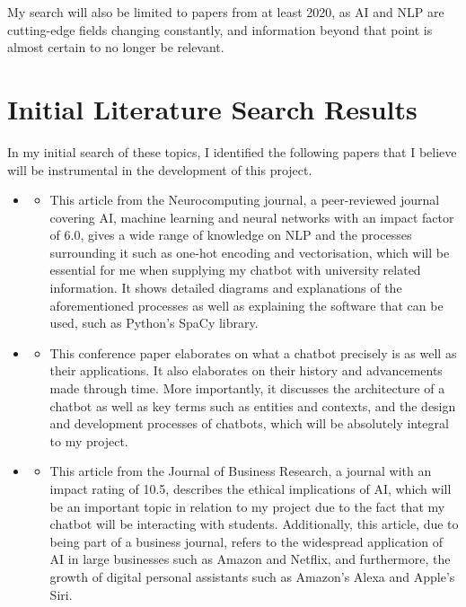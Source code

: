 \documentclass[12pt]{report}
\begin{document}
    \noindent My search will also be limited to papers from at least 2020, as AI and NLP are cutting-edge fields changing
    constantly, and information beyond that point is almost certain to no longer be relevant.

    \section{Initial Literature Search Results}
    In my initial search of these topics, I identified the following papers that I believe will be instrumental
    in the development of this project.

    \begin{itemize}
        \item {} 
        \begin{itemize}
            \item This article from the Neurocomputing journal, a peer-reviewed journal covering AI, machine learning
            and neural networks with an impact factor of 6.0, gives a wide range of knowledge on NLP and the processes
            surrounding it such as one-hot encoding and vectorisation, which will be essential for me when 
            supplying my chatbot with university related information. It shows detailed diagrams and explanations of
            the aforementioned processes as well as explaining the software that can be used, such as Python's 
            SpaCy library.
        \end{itemize}

        \item {}
        \begin{itemize}
            \item This conference paper elaborates on what a chatbot precisely is as well as their applications. It
            also elaborates on their history and advancements made through time. More importantly, it discusses the
            architecture of a chatbot as well as key terms such as entities and contexts, and the design and 
            development processes of chatbots, which will be absolutely integral to my project.
        \end{itemize}

        \item {}
        \begin{itemize}
            \item This article from the Journal of Business Research, a journal with an impact rating of 10.5,
            describes the ethical implications of AI, which will be an important topic in relation to my project
            due to the fact that my chatbot will be interacting with students. Additionally, this article,
            due to being part of a business journal, refers to the widespread application of AI in large businesses
            such as Amazon and Netflix, and furthermore, the growth of digital personal assistants such as Amazon's
            Alexa and Apple's Siri. 
        \end{itemize}


\end{itemize}
\end{document}
